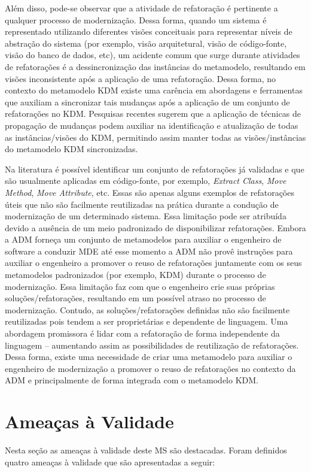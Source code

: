 Além disso, pode-se observar que a atividade de refatoração é pertinente a qualquer processo de modernização. Dessa forma, quando um sistema é representado utilizando diferentes visões conceituais para representar níveis de abstração do sistema (por exemplo, visão arquitetural, visão de código-fonte, visão do banco de dados, etc), um acidente comum que surge durante atividades de refatorações é a dessincronização das instâncias do metamodelo, resultando em visões inconsistente após a aplicação de uma refatoração. Dessa forma, no contexto do metamodelo KDM existe uma carência em abordagens e ferramentas que auxiliam a sincronizar tais mudanças após a aplicação de um conjunto de refatorações no KDM. Pesquisas recentes sugerem que a aplicação de técnicas de propagação de mudanças podem auxiliar na identificação e atualização de todas as instâncias/visões do KDM, permitindo assim manter todas as visões/instâncias do metamodelo KDM sincronizadas. 

Na literatura é possível identificar um conjunto de refatorações já validadas e que são usualmente aplicadas em código-fonte, por exemplo, \textit{Extract Class}, \textit{Move Method}, \textit{Move Attribute}, etc. Essas são apenas alguns exemplos de refatorações úteis que não são facilmente reutilizadas na prática durante a condução de modernização de um determinado sistema. Essa limitação pode ser atribuída devido a ausência de um meio padronizado de disponibilizar refatorações. Embora a ADM forneça um conjunto de metamodelos para auxiliar o engenheiro de software a conduzir MDE até esse momento a ADM não provê instruções para auxiliar o engenheiro a promover o reuso de refatorações juntamente com os seus metamodelos padronizados (por exemplo, KDM) durante o processo de modernização. Essa limitação faz com que o engenheiro crie suas próprias soluções/refatorações, resultando em um possível atraso no processo de modernização. Contudo, as soluções/refatorações  definidas não são facilmente reutilizadas pois tendem a ser proprietárias e dependente de linguagem. Uma abordagem promissora é lidar com a refatoração de forma independente da linguagem – aumentando assim as possibilidades de reutilização de refatorações. Dessa forma, existe uma necessidade de criar uma metamodelo para auxiliar o engenheiro de modernização a promover o reuso de refatorações no contexto da ADM e principalmente de forma integrada com o metamodelo KDM. 

\section{Ameaças à Validade}
Nesta seção as ameaças à validade deste MS são destacadas. Foram definidos quatro ameaças à validade que são apresentadas a seguir:


